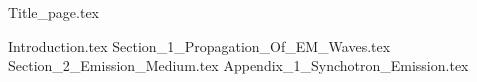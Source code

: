 \documentclass[a4paper,11pt]{article}
\numberwithin{equation}{section}
\numberwithin{figure}{section}
\begin{document}
{Title_page.tex}

\tableofcontents
\listoffigures
\newpage
{Introduction.tex}
\newpage
{Section_1_Propagation_Of_EM_Waves.tex}
{Section_2_Emission_Medium.tex}
\newpage
{Appendix_1_Synchotron_Emission.tex}
\end{document}
